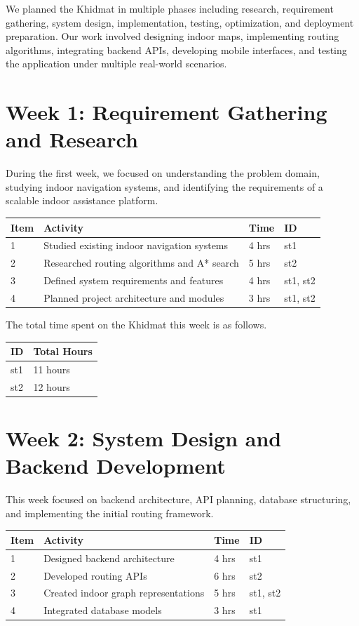 \documentclass{article}
\begin{document}
We planned the Khidmat in multiple phases including research, requirement gathering, system design, implementation, testing, optimization, and deployment preparation. Our work involved designing indoor maps, implementing routing algorithms, integrating backend APIs, developing mobile interfaces, and testing the application under multiple real-world scenarios.

\newpage
\section*{Week 1: Requirement Gathering and Research}

During the first week, we focused on understanding the problem domain, studying indoor navigation systems, and identifying the requirements of a scalable indoor assistance platform.

\begin{tabular}{|l|l|l|l|}
  \hline
  Item & Activity & Time & ID \\\hline\hline
  1 & Studied existing indoor navigation systems & 4 hrs & st1 \\\hline
  2 & Researched routing algorithms and A* search & 5 hrs & st2 \\\hline
  3 & Defined system requirements and features & 4 hrs & st1, st2 \\\hline
  4 & Planned project architecture and modules & 3 hrs & st1, st2 \\\hline
\end{tabular}

\bigskip

The total time spent on the Khidmat this week is as follows.

\begin{tabular}{|l|l|}
  \hline
  ID & Total Hours \\\hline\hline
  st1 & 11 hours \\\hline
  st2 & 12 hours \\\hline
\end{tabular}

\newpage
\section*{Week 2: System Design and Backend Development}

This week focused on backend architecture, API planning, database structuring, and implementing the initial routing framework.

\begin{tabular}{|l|l|l|l|}
  \hline
  Item & Activity & Time & ID \\\hline\hline
  1 & Designed backend architecture & 4 hrs & st1 \\\hline
  2 & Developed routing APIs & 6 hrs & st2 \\\hline
  3 & Created indoor graph representations & 5 hrs & st1, st2 \\\hline
  4 & Integrated database models & 3 hrs & st1 \\\hline
\end{tabular}
\end{document}
